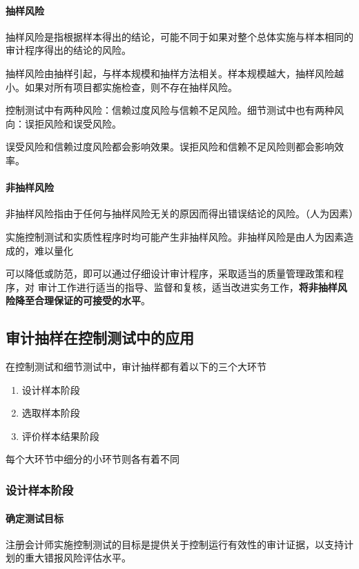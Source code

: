 \documentclass[UTF8,12pt]{ctexart}
\numberwithin{equation}{section} %
\numberwithin{figure}{section}
\numberwithin{table}{section}
\begin{document}
	\paragraph{抽样风险}
	抽样风险是指根据样本得出的结论，可能不同于如果对整个总体实施与样本相同的审计程序得出的结论的风险。
	
	抽样风险由抽样引起，与样本规模和抽样方法相关。样本规模越大，抽样风险越小。如果对所有项目都实施检查，则不存在抽样风险。
	
	控制测试中有两种风险：信赖过度风险与信赖不足风险。细节测试中也有两种风向：误拒风险和误受风险。
	
	误受风险和信赖过度风险都会影响效果。误拒风险和信赖不足风险则都会影响效率。
	
	\paragraph{非抽样风险}
	非抽样风险指由于任何与抽样风险无关的原因而得出错误结论的风险。（人为因素）
	
	实施控制测试和实质性程序时均可能产生非抽样风险。非抽样风险是由人为因素造成的，难以量化
	
	可以降低或防范，即可以通过仔细设计审计程序，采取适当的质量管理政策和程序，对 审计工作进行适当的指导、监督和复核，适当改进实务工作，\textbf{将非抽样风险降至合理保证的可接受的水平}。
	
	\subsection{审计抽样在控制测试中的应用}
	在控制测试和细节测试中，审计抽样都有着以下的三个大环节
	\begin{enumerate}
		\item 设计样本阶段
		
		\item 选取样本阶段
		
		\item 评价样本结果阶段
	\end{enumerate}
	每个大环节中细分的小环节则各有着不同
	
	\subsubsection{设计样本阶段}
	\paragraph{确定测试目标} 注册会计师实施控制测试的目标是提供关于控制运行有效性的审计证据，以支持计划的重大错报风险评估水平。
	
\end{document}
